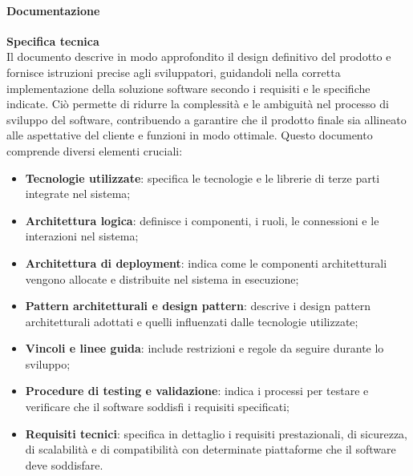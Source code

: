 \paragraph{Documentazione}
\textbf{Specifica tecnica} \\
Il documento descrive in modo approfondito il design definitivo del prodotto e fornisce istruzioni precise agli sviluppatori, guidandoli nella corretta implementazione della soluzione software secondo i requisiti e le specifiche indicate. Ciò permette di ridurre la complessità e le ambiguità nel processo di sviluppo del software, contribuendo a garantire che il prodotto finale sia allineato alle aspettative del cliente e funzioni in modo ottimale.
Questo documento comprende diversi elementi cruciali: 
\begin{itemize}
    \item \textbf{Tecnologie utilizzate}: specifica le tecnologie e le librerie di terze parti integrate nel sistema;
    \item \textbf{Architettura logica}: definisce i componenti, i ruoli, le connessioni e le interazioni nel sistema;
    \item \textbf{Architettura di deployment}: indica come le componenti architetturali vengono allocate e distribuite nel sistema in esecuzione;
    \item \textbf{Pattern architetturali e design pattern}: descrive i design pattern architetturali adottati e quelli influenzati dalle tecnologie utilizzate;
    \item \textbf{Vincoli e linee guida}: include restrizioni e regole da seguire durante lo sviluppo;
    \item \textbf{Procedure di testing e validazione}: indica i processi per testare e verificare che il software soddisfi i requisiti specificati;
    \item \textbf{Requisiti tecnici}: specifica in dettaglio i requisiti prestazionali, di sicurezza, di scalabilità e di compatibilità con determinate piattaforme che il software deve soddisfare.
\end{itemize}

